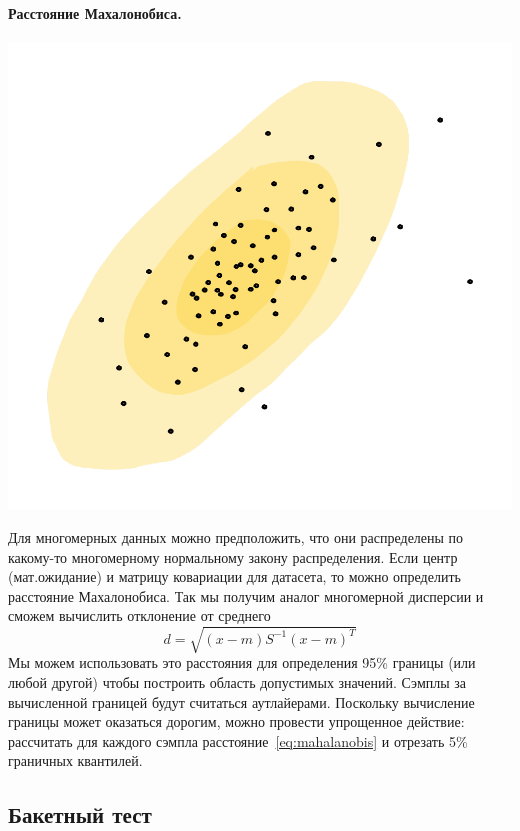 \documentclass[../handbook.tex]{subfiles}
\begin{document}
\paragraph{Расстояние Махалонобиса.}
\begin{marginfigure}
    \includegraphics[width=0.8\columnwidth]{pics/mahalanobis.pdf}
\end{marginfigure}
Для многомерных данных можно предположить, что они распределены по какому-то многомерному нормальному закону распределения. Если центр (мат.ожидание) и матрицу ковариации для датасета, то можно определить расстояние Махалонобиса. Так мы получим аналог много\-мерной дисперсии и сможем вычислить отклонение от среднего
\begin{equation}
    \label{eq:mahalanobis}
    d = \sqrt{ (x - m) S^{-1}(x-m)^T}
\end{equation}
Мы можем использовать это расстояния для определения 95\% границы (или любой другой) чтобы построить область допустимых значений. Сэмплы за вычисленной границей будут считаться аутлайерами. Поскольку вычисление границы может оказаться дорогим, можно провести упрощенное действие: рассчитать для каждого сэмпла расстояние~\ref{eq:mahalanobis} и отрезать 5\% граничных квантилей.

\subsection{Бакетный тест}
\end{document}
